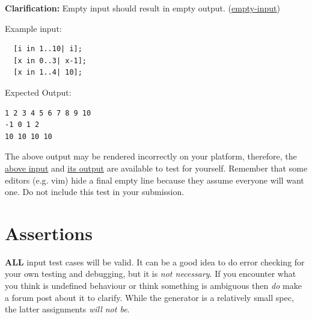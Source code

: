 \documentclass{article}
\newcommand{\clarification}[2]{\textbf{Clarification: }#1 (\hyperlink{#2}{#2})}
\begin{document}
\clarification{Empty input should result in empty output.}{empty-input}

Example input:
\begin{lstlisting}
  [i in 1..10| i];
  [x in 0..3| x-1];
  [x in 1..4| 10];
\end{lstlisting}

Expected Output:
\begin{lstlisting}
1 2 3 4 5 6 7 8 9 10
-1 0 1 2
10 10 10 10
\end{lstlisting}

The above output may be rendered incorrectly on your platform, therefore, the
\href{https://webdocs.cs.ualberta.ca/\%7Ec415/generator/static/ex.in} {above input} and
\href{https://webdocs.cs.ualberta.ca/\%7Ec415/generator/static/ex.out} {its output} are available
to test for yourself. Remember that some editors (e.g. vim) hide a final empty line because they
assume everyone will want one. Do not include this test in your submission.

\section{Assertions}
\textbf{ALL} input test cases will be valid. It can be a good idea to do error checking for your
own testing and debugging, but it is \textit{not necessary}. If you encounter what you think is
undefined behaviour or think something is ambiguous then \textit{do} make a forum post about it to
clarify. While the generator is a relatively small spec, the latter assignments \textit{will not
be}.
\end{document}
